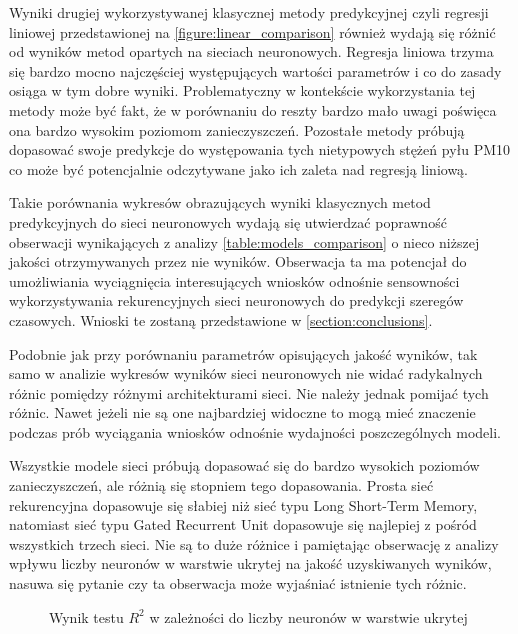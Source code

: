 \documentclass[10pt,a4paper]{article}
\begin{document}
Wyniki drugiej wykorzystywanej klasycznej metody predykcyjnej czyli regresji liniowej przedstawionej na \autoref{figure:linear_comparison} również wydają się różnić od wyników metod opartych na sieciach neuronowych. Regresja liniowa trzyma się bardzo mocno najczęściej występujących wartości parametrów i co do zasady osiąga w tym dobre wyniki. Problematyczny w kontekście wykorzystania tej metody może być fakt, że w porównaniu do reszty bardzo mało uwagi poświęca ona bardzo wysokim poziomom zanieczyszczeń. Pozostałe metody próbują dopasować swoje predykcje do występowania tych nietypowych stężeń pyłu PM10 co może być potencjalnie odczytywane jako ich zaleta nad regresją liniową. 

Takie porównania wykresów obrazujących wyniki klasycznych metod predykcyjnych do sieci neuronowych wydają się utwierdzać poprawność obserwacji wynikających z analizy \autoref{table:models_comparison} o nieco niższej jakości otrzymywanych przez nie wyników. Obserwacja ta ma potencjał do umożliwiania wyciągnięcia interesujących wniosków odnośnie sensowności wykorzystywania rekurencyjnych sieci neuronowych do predykcji szeregów czasowych. Wnioski te zostaną przedstawione w \autoref{section:conclusions}.

Podobnie jak przy porównaniu parametrów opisujących jakość wyników, tak samo w analizie wykresów wyników sieci neuronowych nie widać radykalnych różnic pomiędzy różnymi architekturami sieci. Nie należy jednak pomijać tych różnic. Nawet jeżeli nie są one najbardziej widoczne to mogą mieć znaczenie podczas prób wyciągania wniosków odnośnie wydajności poszczególnych modeli. 

Wszystkie modele sieci próbują dopasować się do bardzo wysokich poziomów zanieczyszczeń, ale różnią się stopniem tego dopasowania. Prosta sieć rekurencyjna dopasowuje się słabiej niż sieć typu Long Short-Term Memory, natomiast sieć typu Gated Recurrent Unit dopasowuje się najlepiej z pośród wszystkich trzech sieci. Nie są to duże różnice i pamiętając obserwację z analizy wpływu liczby neuronów w warstwie ukrytej na jakość uzyskiwanych wyników, nasuwa się pytanie czy ta obserwacja może wyjaśniać istnienie tych różnic.

\begin{figure}[!ht]
	\centering
	\caption{Wynik testu $R^2$ w zależności do liczby neuronów w warstwie ukrytej}
	\label{figure:neurons_comparison}
\end{figure}
\FloatBarrier
\end{document}
